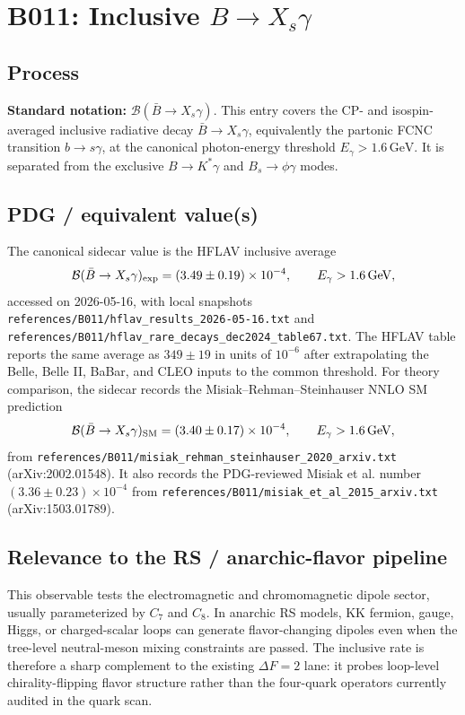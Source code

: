 
\section{B011: Inclusive \(B\to X_s\gamma\)}

\subsection*{Process}
\textbf{Standard notation:} \(\mathcal{B}(\bar B\to X_s\gamma)\).
This entry covers the CP- and isospin-averaged inclusive radiative decay
\(\bar B\to X_s\gamma\), equivalently the partonic FCNC transition
\(b\to s\gamma\), at the canonical photon-energy threshold
\(E_\gamma>1.6\,\mathrm{GeV}\).  It is separated from the exclusive
\(B\to K^*\gamma\) and \(B_s\to\phi\gamma\) modes.

\subsection*{PDG / equivalent value(s)}
The canonical sidecar value is the HFLAV inclusive average
\[
  {\cal B}(\bar B\to X_s\gamma)_{\rm exp}
  = (3.49\pm0.19)\times 10^{-4},
  \qquad E_\gamma>1.6\,\mathrm{GeV},
\]
accessed on 2026-05-16, with local snapshots
\texttt{references/B011/hflav\_results\_2026-05-16.txt} and
\texttt{references/B011/hflav\_rare\_decays\_dec2024\_table67.txt}.  The
HFLAV table reports the same average as \(349\pm19\) in units of \(10^{-6}\)
after extrapolating the Belle, Belle II, BaBar, and CLEO inputs to the common
threshold.  For theory comparison, the sidecar records the
Misiak--Rehman--Steinhauser NNLO SM prediction
\[
  {\cal B}(\bar B\to X_s\gamma)_{\rm SM}
  = (3.40\pm0.17)\times 10^{-4},
  \qquad E_\gamma>1.6\,\mathrm{GeV},
\]
from \texttt{references/B011/misiak\_rehman\_steinhauser\_2020\_arxiv.txt}
(arXiv:2002.01548).  It also records the PDG-reviewed Misiak et al. number
\((3.36\pm0.23)\times10^{-4}\) from
\texttt{references/B011/misiak\_et\_al\_2015\_arxiv.txt}
(arXiv:1503.01789).

\subsection*{Relevance to the RS / anarchic-flavor pipeline}
This observable tests the electromagnetic and chromomagnetic dipole sector,
usually parameterized by \(C_7\) and \(C_8\).  In anarchic RS models,
KK fermion, gauge, Higgs, or charged-scalar loops can generate flavor-changing
dipoles even when the tree-level neutral-meson mixing constraints are passed.
The inclusive rate is therefore a sharp complement to the existing
\(\Delta F=2\) lane: it probes loop-level chirality-flipping flavor structure
rather than the four-quark operators currently audited in the quark scan.

